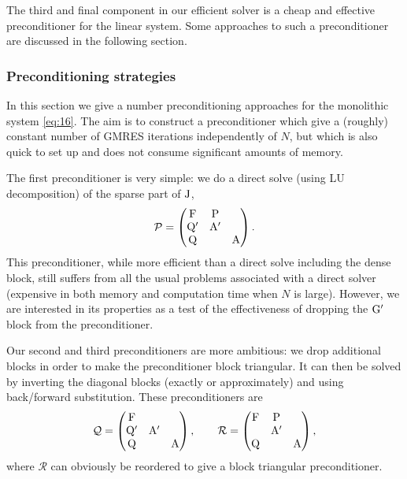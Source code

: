 The third and final component in our efficient solver is a cheap and effective preconditioner for the linear system.
Some approaches to such a preconditioner are discussed in the following section.


\subsubsection{Preconditioning strategies}
\label{sec:bem-solver-strategies}

\newcommand{\preca}{\mathcal{P}}
\newcommand{\precb}{\mathcal{Q}}
\newcommand{\precc}{\mathcal{R}}


\newcommand{\inexact}[1]{\widetilde{#1}}
\newcommand{\parinexact}[1]{\hat{#1}}
\newcommand{\pbin}{\inexact{\precb}}
\newcommand{\pcin}{\inexact{\precc}}




In this section we give a number preconditioning approaches for the monolithic system \cref{eq:16}.
The aim is to construct a preconditioner which give a (roughly) constant number of GMRES iterations independently of $N$, but which is also quick to set up and does not consume significant amounts of memory.

The first preconditioner is very simple: we do a direct solve (using LU decomposition) of the sparse part of $\mathrm{J}$, \ie
\begin{equation}
  \preca =
  \begin{pmatrix}
    \Fm       & \Pm     &  \\
    \Qm'       & \Am'    &   \\
    \Qm       &         &   \Am
  \end{pmatrix}.
\end{equation}
This preconditioner, while more efficient than a direct solve including the dense block, still suffers from all the usual problems associated with a direct solver (\ie expensive in both memory and computation time when $N$ is large).
However, we are interested in its properties as a test of the effectiveness of dropping the $\mathrm{G}'$ block from the preconditioner.

Our second and third preconditioners are more ambitious: we drop additional blocks in order to make the preconditioner block triangular.
It can then be solved by inverting the diagonal blocks (exactly or approximately) and using back/forward substitution.
These preconditioners are
\begin{equation}
  \precb =
  \begin{pmatrix}
    \Fm       &           &  \\
    \Qm'       & \Am'&   \\
    \Qm       &           &   \Am
  \end{pmatrix},
  \qquad
  \precc =
  \begin{pmatrix}
    \Fm       & \Pm       &  \\
    & \Am' &   \\
    \Qm       &           &   \Am
  \end{pmatrix},
  \label{eq:ms-block-prec-drop-p}
\end{equation}
where $\precc$ can obviously be reordered to give a block triangular preconditioner.

